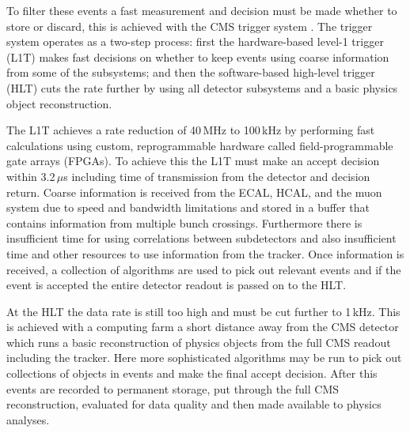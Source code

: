 To filter these events a fast measurement and decision must be made whether to store or discard, this is achieved with the CMS trigger system \cite{trigger}. The trigger system operates as a two-step process: first the hardware-based level-1 trigger (L1T) makes fast decisions on whether to keep events using coarse information from some of the subsystems; and then the software-based high-level trigger (HLT) cuts the rate further by using all detector subsystems and a basic physics object reconstruction. 


The L1T achieves a rate reduction of 40\,MHz to 100\,kHz by performing fast calculations using custom, reprogrammable hardware called field-programmable gate arrays (FPGAs).
To achieve this the L1T must make an accept decision within 3.2\,$\mu$s including time of transmission from the detector and decision return. 
Coarse information is received from the ECAL, HCAL, and the muon system due to speed and bandwidth limitations and stored in a buffer that contains information from multiple bunch crossings. 
Furthermore there is insufficient time for using correlations between subdetectors and also insufficient time and other resources to use information from the tracker. 
Once information is received, a collection of algorithms are used to pick out relevant events and if the event is accepted the entire detector readout is passed on to the HLT.


At the HLT the data rate is still too high and must be cut further to 1\,kHz. This is achieved with a computing farm a short distance away from the CMS detector which runs a basic reconstruction of physics objects from the full CMS readout including the tracker. Here more sophisticated algorithms may be run to pick out collections of objects in events and make the final accept decision.
After this events are recorded to permanent storage, put through the full CMS reconstruction, evaluated for data quality and then made available to physics analyses. 





